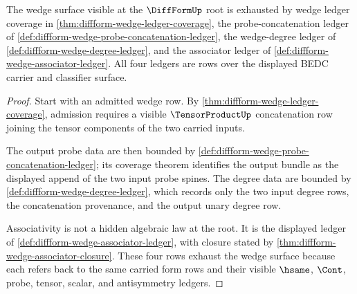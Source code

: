 \begin{theorem}
\label{thm:diffform-root-wedge-ledger-obligation}
The wedge surface visible at the $\DiffFormUp$ root is exhausted by wedge
ledger coverage in \autoref{thm:diffform-wedge-ledger-coverage}, the
probe-concatenation ledger of
\autoref{def:diffform-wedge-probe-concatenation-ledger}, the wedge-degree
ledger of \autoref{def:diffform-wedge-degree-ledger}, and the associator
ledger of \autoref{def:diffform-wedge-associator-ledger}. All four ledgers
are rows over the displayed BEDC carrier and classifier surface.
\end{theorem}
\begin{proof}
Start with an admitted wedge row. By
\autoref{thm:diffform-wedge-ledger-coverage}, admission requires a visible
$\TensorProductUp$ concatenation row joining the tensor components of the two
carried inputs.

The output probe data are then bounded by
\autoref{def:diffform-wedge-probe-concatenation-ledger}; its coverage theorem
identifies the output bundle as the displayed append of the two input probe
spines. The degree data are bounded by
\autoref{def:diffform-wedge-degree-ledger}, which records only the two input
degree rows, the concatenation provenance, and the output unary degree row.

Associativity is not a hidden algebraic law at the root. It is the displayed
ledger of \autoref{def:diffform-wedge-associator-ledger}, with closure stated
by \autoref{thm:diffform-wedge-associator-closure}. These four rows exhaust
the wedge surface because each refers back to the same carried form rows and
their visible $\hsame$, $\Cont$, probe, tensor, scalar, and antisymmetry
ledgers.
\end{proof}

